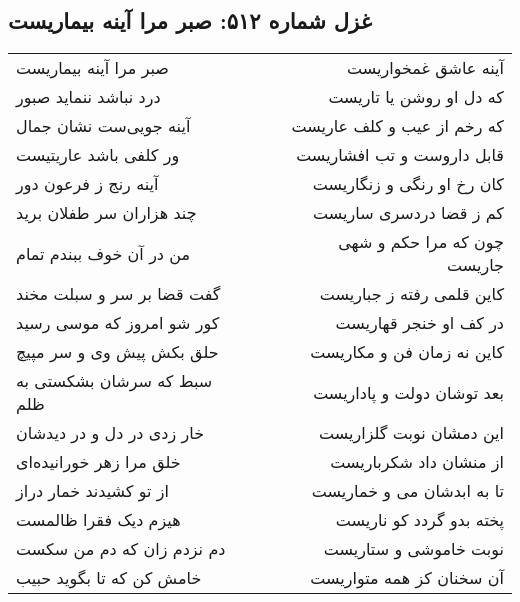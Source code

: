 \begin{center}
\section*{غزل شماره ۵۱۲: صبر مرا آینه بیماریست}
\label{sec:0512}
\begin{longtable}{l p{0.5cm} r}
صبر مرا آینه بیماریست
&&
آینه عاشق غمخواریست
\\
درد نباشد ننماید صبور
&&
که دل او روشن یا تاریست
\\
آینه جویی‌ست نشان جمال
&&
که رخم از عیب و کلف عاریست
\\
ور کلفی باشد عاریتیست
&&
قابل داروست و تب افشاریست
\\
آینه رنج ز فرعون دور
&&
کان رخ او رنگی و زنگاریست
\\
چند هزاران سر طفلان برید
&&
کم ز قضا دردسری ساریست
\\
من در آن خوف ببندم تمام
&&
چون که مرا حکم و شهی جاریست
\\
گفت قضا بر سر و سبلت مخند
&&
کاین قلمی رفته ز جباریست
\\
کور شو امروز که موسی رسید
&&
در کف او خنجر قهاریست
\\
حلق بکش پیش وی و سر مپیچ
&&
کاین نه زمان فن و مکاریست
\\
سبط که سرشان بشکستی به ظلم
&&
بعد توشان دولت و پاداریست
\\
خار زدی در دل و در دیدشان
&&
این دمشان نوبت گلزاریست
\\
خلق مرا زهر خورانیده‌ای
&&
از منشان داد شکرباریست
\\
از تو کشیدند خمار دراز
&&
تا به ابدشان می و خماریست
\\
هیزم دیک فقرا ظالمست
&&
پخته بدو گردد کو ناریست
\\
دم نزدم زان که دم من سکست
&&
نوبت خاموشی و ستاریست
\\
خامش کن که تا بگوید حبیب
&&
آن سخنان کز همه متواریست
\\
\end{longtable}
\end{center}
